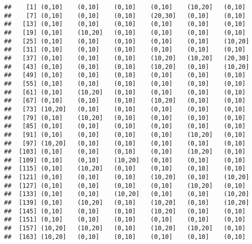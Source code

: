 \documentclass[]{article}
\newenvironment{Shaded}{\begin{snugshade}}{\end{snugshade}}
\newcommand{\KeywordTok}[1]{\textcolor[rgb]{0.13,0.29,0.53}{\textbf{#1}}}
\newcommand{\DataTypeTok}[1]{\textcolor[rgb]{0.13,0.29,0.53}{#1}}
\newcommand{\DecValTok}[1]{\textcolor[rgb]{0.00,0.00,0.81}{#1}}
\newcommand{\StringTok}[1]{\textcolor[rgb]{0.31,0.60,0.02}{#1}}
\newcommand{\OperatorTok}[1]{\textcolor[rgb]{0.81,0.36,0.00}{\textbf{#1}}}
\newcommand{\NormalTok}[1]{#1}
\begin{document}
\begin{Shaded}
\end{Shaded}

\begin{verbatim}
##    [1] (0,10]    (0,10]    (0,10]    (0,10]    (10,20]   (0,10]   
##    [7] (0,10]    (0,10]    (0,10]    (20,30]   (0,10]    (0,10]   
##   [13] (0,10]    (0,10]    (0,10]    (0,10]    (0,10]    (0,10]   
##   [19] (0,10]    (10,20]   (0,10]    (0,10]    (0,10]    (0,10]   
##   [25] (0,10]    (0,10]    (0,10]    (0,10]    (0,10]    (10,20]  
##   [31] (0,10]    (0,10]    (0,10]    (0,10]    (0,10]    (0,10]   
##   [37] (0,10]    (0,10]    (0,10]    (10,20]   (10,20]   (20,30]  
##   [43] (0,10]    (0,10]    (0,10]    (10,20]   (0,10]    (10,20]  
##   [49] (0,10]    (0,10]    (0,10]    (0,10]    (0,10]    (0,10]   
##   [55] (0,10]    (0,10]    (0,10]    (0,10]    (0,10]    (0,10]   
##   [61] (0,10]    (10,20]   (0,10]    (0,10]    (0,10]    (0,10]   
##   [67] (0,10]    (0,10]    (0,10]    (10,20]   (0,10]    (0,10]   
##   [73] (10,20]   (0,10]    (0,10]    (0,10]    (0,10]    (0,10]   
##   [79] (0,10]    (10,20]   (0,10]    (0,10]    (0,10]    (0,10]   
##   [85] (0,10]    (0,10]    (0,10]    (0,10]    (0,10]    (0,10]   
##   [91] (0,10]    (0,10]    (0,10]    (0,10]    (10,20]   (0,10]   
##   [97] (10,20]   (0,10]    (0,10]    (0,10]    (0,10]    (0,10]   
##  [103] (0,10]    (0,10]    (0,10]    (0,10]    (10,20]   (0,10]   
##  [109] (0,10]    (0,10]    (10,20]   (0,10]    (0,10]    (0,10]   
##  [115] (0,10]    (10,20]   (0,10]    (0,10]    (0,10]    (0,10]   
##  [121] (0,10]    (0,10]    (0,10]    (10,20]   (0,10]    (10,20]  
##  [127] (0,10]    (0,10]    (0,10]    (0,10]    (10,20]   (0,10]   
##  [133] (0,10]    (0,10]    (10,20]   (0,10]    (0,10]    (10,20]  
##  [139] (0,10]    (10,20]   (0,10]    (10,20]   (0,10]    (10,20]  
##  [145] (0,10]    (0,10]    (0,10]    (10,20]   (0,10]    (0,10]   
##  [151] (0,10]    (0,10]    (0,10]    (0,10]    (0,10]    (0,10]   
##  [157] (10,20]   (10,20]   (0,10]    (10,20]   (10,20]   (0,10]   
##  [163] (10,20]   (0,10]    (0,10]    (0,10]    (0,10]    (0,10]   

\end{verbatim}
\end{document}
